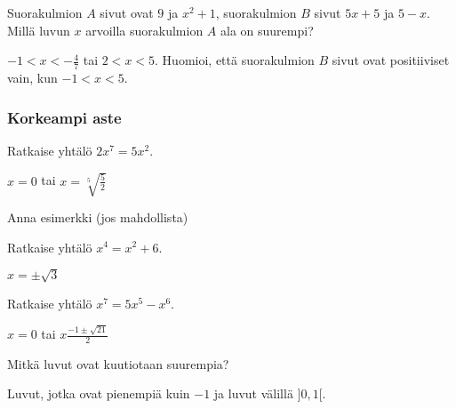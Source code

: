 \begin{tehtavasivu}
\begin{tehtava} 
Suorakulmion $A$ sivut ovat $9$ ja $x^2+1$, suorakulmion $B$ sivut $5x+5$
ja $5-x$. Millä luvun $x$ arvoilla suorakulmion $A$ ala on suurempi?
    \begin{vastaus}
	$-1 < x < -\frac{4}{7}$ tai $2 < x < 5$. Huomioi, että suorakulmion $B$
    sivut ovat positiiviset vain, kun $-1<x<5$.
    \end{vastaus}
\end{tehtava}

\subsubsection*{Korkeampi aste}

\begin{tehtava} 
Ratkaise yhtälö $2x^7=5x^2$.
    \begin{vastaus}
		$x=0$ tai $x=\sqrt[5]{\frac{5}{2}}$
    \end{vastaus}
\end{tehtava}

\begin{tehtava} 
Anna esimerkki (jos mahdollista)
    \begin{vastaus}
    \end{vastaus}
\end{tehtava}

\begin{tehtava} 
Ratkaise yhtälö $x^4=x^2+6$.
    \begin{vastaus}
		$x=\pm \sqrt{3}$
    \end{vastaus}
\end{tehtava}

\begin{tehtava} 
Ratkaise yhtälö
$x^7=5x^5-x^6$.
     \begin{vastaus}
		$x=0$ tai $x\frac{-1 \pm \sqrt{21}}{2}$ 
    \end{vastaus}
\end{tehtava}

\begin{tehtava}
Mitkä luvut ovat kuutiotaan suurempia?
    \begin{vastaus}
	Luvut, jotka ovat pienempiä kuin $-1$ ja luvut välillä $]0,1[$.
    \end{vastaus}
\end{tehtava}


\end{tehtavasivu}
